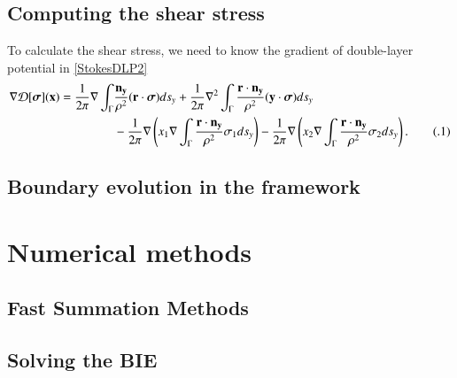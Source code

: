 \documentclass[preprint, 10pt]{elsarticle}
\newcommand{\D}{\mbox{${\mathcal D}$}}
\newcommand\numberthis{\addtocounter{equation}{1}\tag{\theequation}}
\begin{document}
 
\subsection{Computing the shear stress}
\label{sec:shearStressLP}

To calculate the shear stress, we need to know the gradient of double-layer potential in \eqref{StokesDLP2} 
\begin{align*}\label{SSLP}
\nabla\D[\boldsymbol\sigma]({\bf x})=\frac{1}{2\pi}\nabla\int_{\Gamma}&\frac{{\bf n_y}}{\rho^2}({\bf r} \cdot {\boldsymbol \sigma})ds_y+\frac{1}{2\pi}\nabla^2\int_{\Gamma}\frac{{\bf r} \cdot {\bf n_y}}{\rho^2}({\bf y} \cdot{\boldsymbol \sigma})ds_y\\
&-\frac{1}{2\pi}\nabla\left(x_1 \nabla\int_{\Gamma}\frac{{\bf r} \cdot {\bf n_y}}{\rho^2}\sigma_1ds_y\right)-\frac{1}{2\pi}\nabla\left(x_2\nabla\int_{\Gamma}\frac{{\bf r} \cdot {\bf n_y}}{\rho^2}\sigma_2ds_y\right). \numberthis
\end{align*}




\subsection{Boundary evolution in the {\thL} framework} 
\label{sec:thetaL}


\section{Numerical methods}
\label{s:method}

\subsection{Fast Summation Methods}
\label{sec:FMM}

\subsection{Solving the BIE}
\label{sec:BIE}
\end{document}

